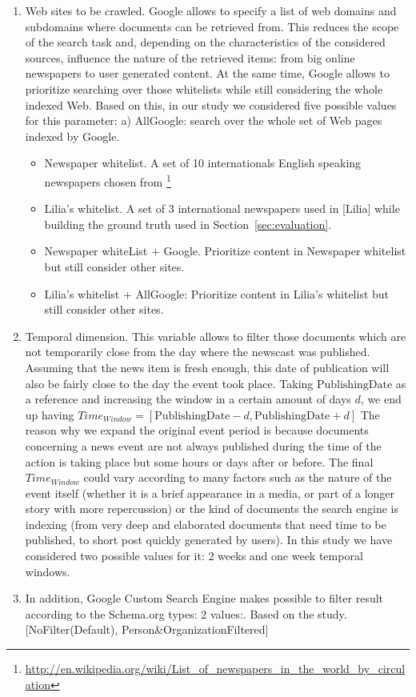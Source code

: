 \documentclass{llncs}
\begin{document}
\begin{enumerate}
 \item Web sites to be crawled. Google allows to specify a list of web domains and subdomains where documents can be retrieved from. This reduces the scope of the search task and, depending on the characteristics of the considered sources, influence the nature of the retrieved items: from big online newspapers to user generated content. At the same time, Google allows to prioritize searching over those whitelists while still considering the  whole indexed Web. Based on this, in our study we considered five possible values for this parameter:
a) AllGoogle: search over the whole set of Web pages indexed by Google.
 \begin{itemize}
  \item Newspaper whitelist. A set of 10 internationals English speaking newspapers chosen from \footnote{\fontsize{8pt}{1em}\selectfont  \url{http://en.wikipedia.org/wiki/List_of_newspapers_in_the_world_by_circulation}}
  \item Lilia's whitelist. A set of 3 international newspapers used in [Lilia] while building the ground truth used in Section~\ref{sec:evaluation}.
  \item Newspaper whiteList + Google. Prioritize content in Newspaper whitelist but still consider other sites.
  \item Lilia's whitelist + AllGoogle: Prioritize content in Lilia's whitelist but still consider other sites.
 \end{itemize}
 \item Temporal dimension. This variable allows to filter those documents which are not temporarily close from the day where the newscast was published. Assuming that the news item is fresh enough, this date of publication will also be fairly close to the day the event  took place. Taking $\text{PublishingDate}$ as a reference and increasing the window in a certain amount of days $d$,  we end up having $Time_{Window}=\left [ \text{PublishingDate}-d, \text{PublishingDate}+d \right ]$ The reason why we expand the original event period is because documents concerning a news event are not always published during the time of the action is taking place but some hours or days after or before. The final $Time_{Window}$ could vary according to many factors such as the nature of the event itself (whether it is a brief appearance in a media, or part of a longer story with more repercussion) or the kind of documents the search engine is indexing (from very deep and elaborated documents that need time to be published, to short post quickly generated by users). In this study we have considered two possible values for it: 2 weeks and one week temporal windows.
 \item In addition, Google Custom Search Engine makes possible to filter result according to the Schema.org types: 2 values:. Based on the study.
[NoFilter(Default), Person\&OrganizationFiltered]
\end{enumerate}
\end{document}
